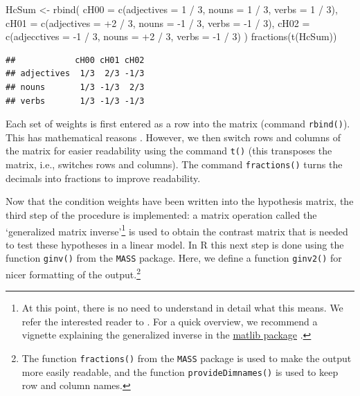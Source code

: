 \documentclass[
  12pt,
]{krantz}
\newenvironment{Shaded}{\begin{snugshade}}{\end{snugshade}}
\newcommand{\AttributeTok}[1]{\textcolor[rgb]{0.77,0.63,0.00}{#1}}
\newcommand{\DecValTok}[1]{\textcolor[rgb]{0.00,0.00,0.81}{#1}}
\newcommand{\FunctionTok}[1]{\textcolor[rgb]{0.00,0.00,0.00}{#1}}
\newcommand{\NormalTok}[1]{#1}
\newcommand{\OtherTok}[1]{\textcolor[rgb]{0.56,0.35,0.01}{#1}}
\newcommand{\SpecialCharTok}[1]{\textcolor[rgb]{0.00,0.00,0.00}{#1}}
\theoremstyle{definition}
\theoremstyle{definition}
\theoremstyle{definition}
\theoremstyle{definition}
\theoremstyle{remark}
\begin{document}
\begin{Shaded}
\begin{Highlighting}[]
\NormalTok{HcSum }\OtherTok{\textless{}{-}} \FunctionTok{rbind}\NormalTok{(}
  \AttributeTok{cH00 =} \FunctionTok{c}\NormalTok{(}\AttributeTok{adjectives =} \DecValTok{1} \SpecialCharTok{/} \DecValTok{3}\NormalTok{, }\AttributeTok{nouns =} \DecValTok{1} \SpecialCharTok{/} \DecValTok{3}\NormalTok{, }\AttributeTok{verbs =} \DecValTok{1} \SpecialCharTok{/} \DecValTok{3}\NormalTok{),}
  \AttributeTok{cH01 =} \FunctionTok{c}\NormalTok{(}\AttributeTok{adjectives =} \SpecialCharTok{+}\DecValTok{2} \SpecialCharTok{/} \DecValTok{3}\NormalTok{, }\AttributeTok{nouns =} \SpecialCharTok{{-}}\DecValTok{1} \SpecialCharTok{/} \DecValTok{3}\NormalTok{, }\AttributeTok{verbs =} \SpecialCharTok{{-}}\DecValTok{1} \SpecialCharTok{/} \DecValTok{3}\NormalTok{),}
  \AttributeTok{cH02 =} \FunctionTok{c}\NormalTok{(}\AttributeTok{adjecctives =} \SpecialCharTok{{-}}\DecValTok{1} \SpecialCharTok{/} \DecValTok{3}\NormalTok{, }\AttributeTok{nouns =} \SpecialCharTok{+}\DecValTok{2} \SpecialCharTok{/} \DecValTok{3}\NormalTok{, }\AttributeTok{verbs =} \SpecialCharTok{{-}}\DecValTok{1} \SpecialCharTok{/} \DecValTok{3}\NormalTok{)}
\NormalTok{)}
\FunctionTok{fractions}\NormalTok{(}\FunctionTok{t}\NormalTok{(HcSum))}
\end{Highlighting}
\end{Shaded}

\begin{verbatim}
##            cH00 cH01 cH02
## adjectives  1/3  2/3 -1/3
## nouns       1/3 -1/3  2/3
## verbs       1/3 -1/3 -1/3
\end{verbatim}

Each set of weights is first entered as a row into the matrix (command \texttt{rbind()}). This has mathematical reasons \citep[see][]{schad2020capitalize}. However, we then switch rows and columns of the matrix for easier readability using the command \texttt{t()} (this transposes the matrix, i.e., switches rows and columns). The command \texttt{fractions()} turns the decimals into fractions to improve readability.

Now that the condition weights have been written into the hypothesis matrix, the third step of the procedure is implemented: a matrix operation called the `generalized matrix inverse'\footnote{At this point, there is no need to understand in detail what this means. We refer the interested reader to \citet{schad2020capitalize}. For a quick overview, we recommend a vignette explaining the generalized inverse in the \href{https://cran.r-project.org/web/packages/matlib/vignettes/ginv.html}{matlib package} \citep{friendly_matlib}.} is used to obtain the contrast matrix that is needed to test these hypotheses in a linear model.
In R this next step is done using the function \texttt{ginv()} from the \texttt{MASS} package. Here, we define a function \texttt{ginv2()} for nicer formatting of the output.\footnote{The function \texttt{fractions()} from the \texttt{MASS} package is used to make the output more easily readable, and the function \texttt{provideDimnames()} is used to keep row and column names.}
\end{document}
